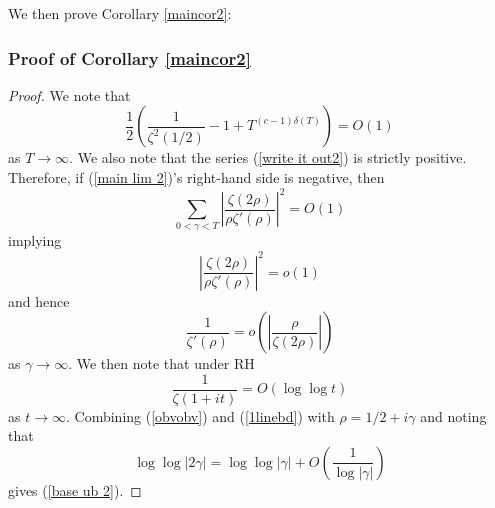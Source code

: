 \documentclass[11pt,article]{amsart}
\numberwithin{equation}{section}
\numberwithin{equation}{section}
\numberwithin{lemma}{section}
\numberwithin{prop}{section}
\begin{document}
We then prove Corollary \ref{maincor2}:
\subsubsection{Proof of Corollary \ref{maincor2}}
\begin{proof}
We note that
\begin{equation}
\frac{1}{2}\left(\frac{1}{\zeta^{2}(1/2)}-1+T^{(c-1)\delta(T)}\right)=O(1)
\end{equation}
as $T\rightarrow \infty$. We also note that the series (\ref{write it out2}) is strictly positive. Therefore, if (\ref{main lim 2})'s right-hand side is negative, then 
\begin{equation}
\sum_{0<\gamma<T}\left|\frac{\zeta(2\rho)}{\rho\zeta'(\rho)}\right|^{2}=O(1)
\end{equation}
implying
\begin{equation}
\left|\frac{\zeta(2\rho)}{\rho\zeta'(\rho)}\right|^{2}=o(1) \label{obviously we have2}
\end{equation}
and hence
\begin{equation}
\frac{1}{\zeta'(\rho)}=o\left(\left|\frac{\rho}{\zeta(2\rho)}\right|\right) \label{obvobv}
\end{equation}
as $\gamma \rightarrow \infty$. We then note that under RH \cite{littlewood1line} \cite{titchmarsh} 
\begin{equation}
\frac{1}{\zeta(1+it)}=O\left(\log \log t\right) \label{1linebd}
\end{equation}
as $t\rightarrow \infty$. Combining (\ref{obvobv}) and (\ref{1linebd}) with $\rho=1/2+i\gamma$ and noting that 
\begin{equation}
\log \log \left|2\gamma\right|=\log \log \left|\gamma\right|+O\left(\frac{1}{\log \left|\gamma\right|}\right)
\end{equation}
gives (\ref{base ub 2}).
\end{proof}

 
\end{document}
